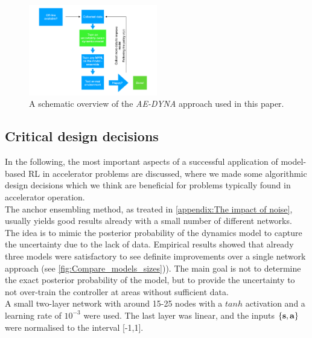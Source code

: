 \documentclass[
reprint,
amsmath,amssymb,amsfonts,clevref,
aps,
prstab,
]{revtex4-2}
\begin{document}
	\begin{figure}[!h]
		\centering
		\includegraphics*[width=0.5\textwidth]{Figures/MBRL_overview}
		\caption{A schematic overview of the \emph{AE-DYNA} approach used in this paper.}
		\label{fig:MBRL_overview}
	\end{figure}
	\subsection{Critical design decisions}\label{ss:critical_design}
In the following, the most important aspects of a successful application of model-based RL in accelerator problems are discussed, where we made some algorithmic design decisions which we think are beneficial for problems typically found in accelerator operation.\\
The anchor ensembling method, as treated in \cref{appendix:The impact of noise}, usually yields good results already with a small number of different networks. The idea is to mimic the posterior probability of the dynamics model to capture the uncertainty due to the lack of data. Empirical results showed that already three models were satisfactory to see definite improvements over a single network approach (see \cref{fig:Compare_models_sizes})). The main goal is not to determine the exact posterior probability of the model, but to provide the uncertainty to not over-train the controller at areas without sufficient data.\\ A small two-layer network with around 15-25 nodes with a $tanh$ activation and a learning rate of $10^{-3}$ were used. The last layer was linear, and the inputs $\{\mathbf{s},\mathbf{a}\}$ were normalised to the interval [-1,1].\\
\end{document}
